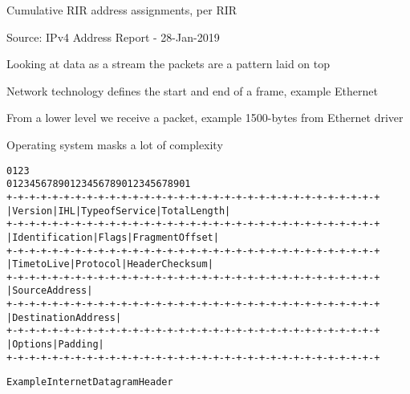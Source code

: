 \documentclass[Screen16to9,17pt]{foils}
\begin{document}

\centerline{Cumulative RIR address assignments, per RIR}

\begin{list1}
\item Source:
IPv4 Address Report - 28-Jan-2019
\end{list1}



\begin{list1}
\item Looking at data as a stream the packets are a pattern laid on top
\item Network technology defines the start and end of a frame, example Ethernet
\item From a lower level we receive a packet, example 1500-bytes from Ethernet driver
\item Operating system masks a lot of complexity
\end{list1}



\begin{alltt}\small
    0                   1                   2                   3
    0 1 2 3 4 5 6 7 8 9 0 1 2 3 4 5 6 7 8 9 0 1 2 3 4 5 6 7 8 9 0 1
   +-+-+-+-+-+-+-+-+-+-+-+-+-+-+-+-+-+-+-+-+-+-+-+-+-+-+-+-+-+-+-+-+
   |Version|  IHL  |Type of Service|          Total Length         |
   +-+-+-+-+-+-+-+-+-+-+-+-+-+-+-+-+-+-+-+-+-+-+-+-+-+-+-+-+-+-+-+-+
   |         Identification        |Flags|      Fragment Offset    |
   +-+-+-+-+-+-+-+-+-+-+-+-+-+-+-+-+-+-+-+-+-+-+-+-+-+-+-+-+-+-+-+-+
   |  Time to Live |    Protocol   |         Header Checksum       |
   +-+-+-+-+-+-+-+-+-+-+-+-+-+-+-+-+-+-+-+-+-+-+-+-+-+-+-+-+-+-+-+-+
   |                       Source Address                          |
   +-+-+-+-+-+-+-+-+-+-+-+-+-+-+-+-+-+-+-+-+-+-+-+-+-+-+-+-+-+-+-+-+
   |                    Destination Address                        |
   +-+-+-+-+-+-+-+-+-+-+-+-+-+-+-+-+-+-+-+-+-+-+-+-+-+-+-+-+-+-+-+-+
   |                    Options                    |    Padding    |
   +-+-+-+-+-+-+-+-+-+-+-+-+-+-+-+-+-+-+-+-+-+-+-+-+-+-+-+-+-+-+-+-+

                    Example Internet Datagram Header
\end{alltt}


\end{document}
